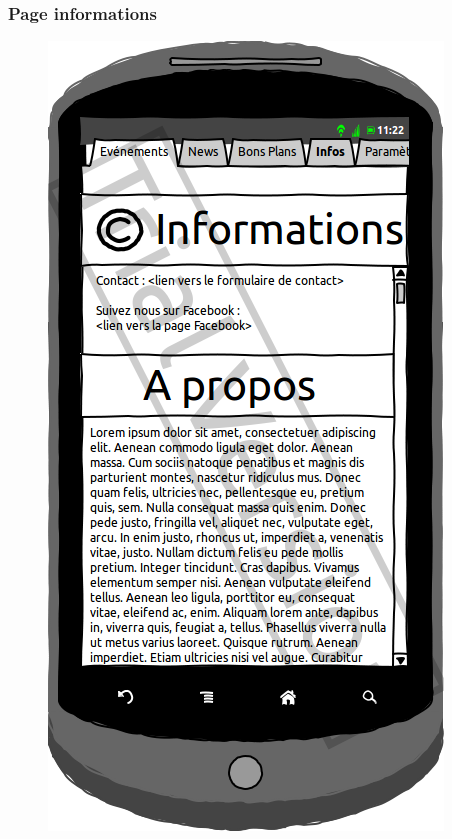 \documentclass[a4paper, 11px]{article}
\begin{document}
\subsubsection{Page informations}
\vfill
\begin{figure}[htbp]
	\begin{minipage}[c]{.50\linewidth}
		\begin{center}
			\includegraphics[scale=0.3]{../../Sketch/Android/Infos.png}
		\end{center}
	\end{minipage}
\end{figure}
\end{document}
